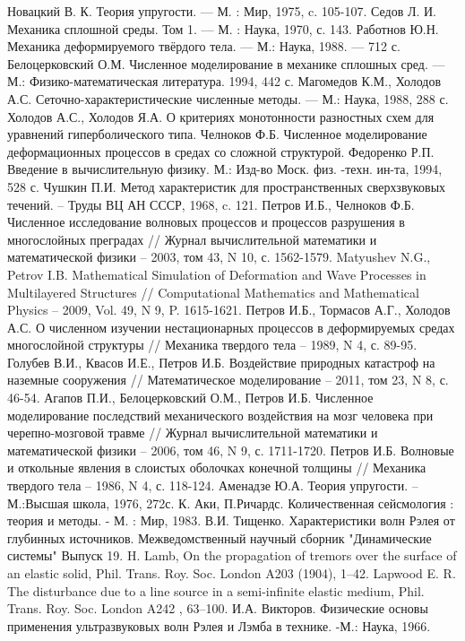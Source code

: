 \begin{thebibliography}{99}
Новацкий В. К. Теория упругости. — М. : Мир, 1975, c. 105-107.
Седов Л. И. Механика сплошной среды. Том 1. — М. : Наука, 1970, с. 143.
Работнов Ю.Н. Механика деформируемого твёрдого тела. — М.: Наука, 1988. — 712 с.
Белоцерковский О.М. Численное моделирование в механике
сплошных сред. — М.: Физико-математическая литература. 1994, 442 с.
Магомедов К.М., Холодов А.С. Сеточно-характеристические
численные методы. — М.: Наука, 1988, 288 с.
Холодов А.С., Холодов Я.А. О критериях монотонности разностных
схем для уравнений гиперболического типа. 
Челноков Ф.Б. Численное моделирование деформационных
процессов в средах со сложной структурой.
Федоренко Р.П. Введение в вычислительную физику. М.:
Изд-во Моск. физ. -техн. ин-та, 1994, 528 с.
Чушкин П.И. Метод характеристик для пространственных сверхзвуковых течений. –  Труды ВЦ АН СССР, 1968, c. 121.
Петров И.Б., Челноков Ф.Б. Численное исследование волновых процессов и процессов разрушения в многослойных преградах // Журнал вычислительной математики и математической физики – 2003, том 43, N 10, с. 1562-1579.
Matyushev N.G., Petrov I.B. Mathematical Simulation of Deformation and Wave Processes in Multilayered Structures // Computational Mathematics and Mathematical Physics – 2009, Vol. 49, N 9, P. 1615-1621.
Петров  И.Б., Тормасов А.Г., Холодов А.С. О численном изучении нестационарных процессов в деформируемых средах многослойной структуры // Механика твердого тела – 1989, N 4, с. 89-95.
Голубев В.И., Квасов И.Е., Петров И.Б. Воздействие природных катастроф на наземные сооружения // Математическое моделирование – 2011, том 23, N 8, с. 46-54.
Агапов П.И., Белоцерковский О.М., Петров И.Б. Численное моделирование последствий механического воздействия на мозг человека при черепно-мозговой травме // Журнал вычислительной математики и математической физики – 2006, том 46, N 9, с. 1711-1720.
Петров И.Б. Волновые и откольные явления в слоистых оболочках конечной толщины // Механика твердого тела – 1986, N 4, с. 118-124.
Аменадзе Ю.А. Теория упругости. – М.:Высшая школа, 1976, 272с.
К. Аки, П.Ричардс. Количественная сейсмология : теория и методы. - М. : Мир, 1983.
В.И. Тищенко. Характеристики волн Рэлея от глубинных источников. Межведомственный научный сборник "Динамические системы" Выпуск 19.
H. Lamb, On the propagation of tremors over the surface of an elastic solid, Phil. Trans. Roy. Soc. London A203 (1904), 1–42.
Lapwood E. R. The disturbance due to a line source in a semi-infinite elastic medium, Phil. Trans. Roy. Soc. London A242 , 63–100.
И.А. Викторов. Физические основы применения ультразвуковых волн Рэлея и Лэмба в технике. -М.: Наука, 1966.
\end{thebibliography}
